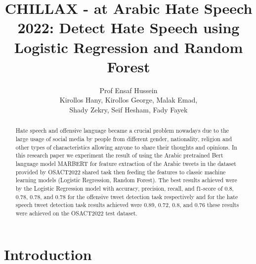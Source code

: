 \documentclass[conference]{IEEEtran}
\title{CHILLAX - at Arabic Hate Speech 2022: Detect Hate Speech using Logistic Regression and Random Forest}
\author{Prof Ensaf Hussein \\Kirollos Hany, Kirollos George, Malak Emad, \\ Shady Zekry, Seif Hesham, Fady Fayek}
\date{}
\begin{document}
	
\nocite{*}
	
\maketitle

\begin{abstract}
	Hate speech and offensive language became a crucial problem nowadays due to the large usage of social media by people from different gender, nationality, religion and other types of characteristics allowing anyone to share their thoughts and opinions. In this research paper we experiment the result of using the Arabic pretrained Bert language model MARBERT for feature extraction of the Arabic tweets in the dataset provided by OSACT2022 shared task then feeding the features to classic machine learning models (Logistic Regression, Random Forest). The best results achieved were by the Logistic Regression model with accuracy, precision, recall, and f1-score of 0.8, 0.78, 0.78, and 0.78 for the offensive tweet detection task respectively and for the hate speech tweet detection task results achieved were 0.89, 0.72, 0.8, and 0.76 these results were achieved on the OSACT2022 test dataset.
\end{abstract}

\section{Introduction}
\end{document}

